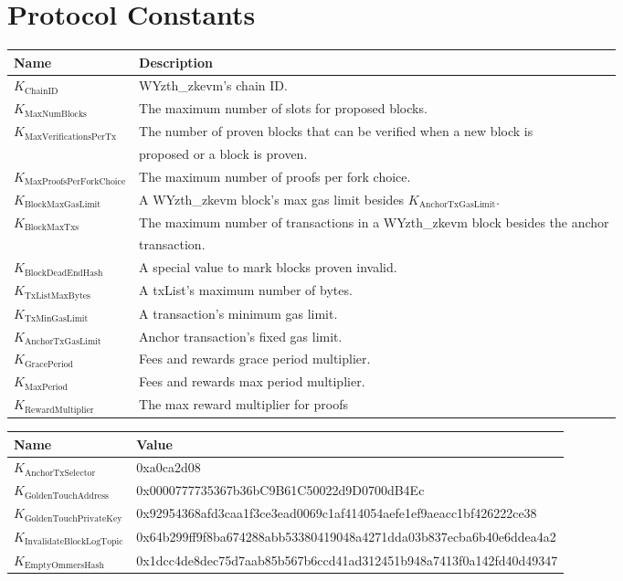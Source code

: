 \documentclass[9pt,oneside]{amsart}
\begin{document}
\section{Protocol Constants}\label{sec:constants1}

\begin{tabu}{l l}
\toprule
Name  & Description \\
\midrule
$K_{\mathrm{ChainID}}$ & WYzth_zkevm's chain ID. \\
$K_{\mathrm{MaxNumBlocks}}$ & The maximum number of slots for proposed blocks. \\
$K_{\mathrm{MaxVerificationsPerTx}}$  & The number of proven blocks that can be verified when a new block is\\
& proposed or a block is proven. \\
$K_{\mathrm{MaxProofsPerForkChoice}}$ & The maximum number of proofs per fork choice. \\
$K_{\mathrm{BlockMaxGasLimit}}$  & A WYzth_zkevm block's max gas limit besides $K_{\mathrm{AnchorTxGasLimit}}$.  \\
$K_{\mathrm{BlockMaxTxs}}$  & The maximum number of transactions in a WYzth_zkevm block besides the anchor\\
&  transaction. \\
$K_{\mathrm{BlockDeadEndHash}}$ & A special value to mark blocks proven invalid. \\
$K_{\mathrm{TxListMaxBytes}}$  & A txList's maximum number of bytes. \\
$K_{\mathrm{TxMinGasLimit}}$  & A transaction's minimum gas limit. \\
$K_{\mathrm{AnchorTxGasLimit}}$  & Anchor transaction's fixed gas limit. \\
$K_{\mathrm{GracePeriod}}$  & Fees and rewards grace period multiplier. \\
$K_{\mathrm{MaxPeriod}}$ & Fees and rewards max period multiplier. \\
$K_{\mathrm{RewardMultiplier}}$ & The max reward multiplier for proofs \\
\bottomrule
\end{tabu}

\begin{tabu}{l l}
\toprule
Name &  \quad \quad Value \\
\midrule
$K_{\mathrm{AnchorTxSelector}}$ &  \quad \quad 0xa0ca2d08 \\
$K_{\mathrm{GoldenTouchAddress}}$ &  \quad \quad 0x0000777735367b36bC9B61C50022d9D0700dB4Ec  \\
$K_{\mathrm{GoldenTouchPrivateKey}}$ & \quad \quad 0x92954368afd3caa1f3ce3ead0069c1af414054aefe1ef9aeacc1bf426222ce38 \\
$K_{\mathrm{InvalidateBlockLogTopic}}$ & \quad \quad 0x64b299ff9f8ba674288abb53380419048a4271dda03b837ecba6b40e6ddea4a2 \\
$K_{\mathrm{EmptyOmmersHash}}$ & \quad \quad 0x1dcc4de8dec75d7aab85b567b6ccd41ad312451b948a7413f0a142fd40d49347   \quad \quad \quad \quad \\
\bottomrule
\end{tabu}
\end{document}

